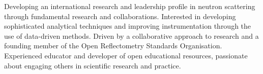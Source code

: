 \vspace{0.25cm}

\begin{cvparagraph}

Developing an international research and leadership profile in neutron scattering through fundamental research and collaborations.
Interested in developing sophisticated analytical techniques and improving instrumentation through the use of data-driven methods.
Driven by a collaborative approach to research and a founding member of the Open Reflectometry Standards Organisation.
Experienced educator and developer of open educational resources, passionate about engaging others in scientific research and practice.
\end{cvparagraph}
